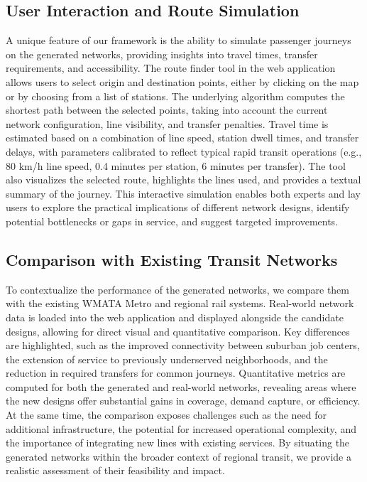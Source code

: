 \documentclass[manuscript,screen,review]{acmart}
\begin{document}
\subsection{User Interaction and Route Simulation}
A unique feature of our framework is the ability to simulate passenger journeys on the generated networks, providing insights into travel times, transfer requirements, and accessibility. The route finder tool in the web application allows users to select origin and destination points, either by clicking on the map or by choosing from a list of stations. The underlying algorithm computes the shortest path between the selected points, taking into account the current network configuration, line visibility, and transfer penalties. Travel time is estimated based on a combination of line speed, station dwell times, and transfer delays, with parameters calibrated to reflect typical rapid transit operations (e.g., 80 km/h line speed, 0.4 minutes per station, 6 minutes per transfer). The tool also visualizes the selected route, highlights the lines used, and provides a textual summary of the journey. This interactive simulation enables both experts and lay users to explore the practical implications of different network designs, identify potential bottlenecks or gaps in service, and suggest targeted improvements.

\subsection{Comparison with Existing Transit Networks}
To contextualize the performance of the generated networks, we compare them with the existing WMATA Metro and regional rail systems. Real-world network data is loaded into the web application and displayed alongside the candidate designs, allowing for direct visual and quantitative comparison. Key differences are highlighted, such as the improved connectivity between suburban job centers, the extension of service to previously underserved neighborhoods, and the reduction in required transfers for common journeys. Quantitative metrics are computed for both the generated and real-world networks, revealing areas where the new designs offer substantial gains in coverage, demand capture, or efficiency. At the same time, the comparison exposes challenges such as the need for additional infrastructure, the potential for increased operational complexity, and the importance of integrating new lines with existing services. By situating the generated networks within the broader context of regional transit, we provide a realistic assessment of their feasibility and impact.
\end{document}
